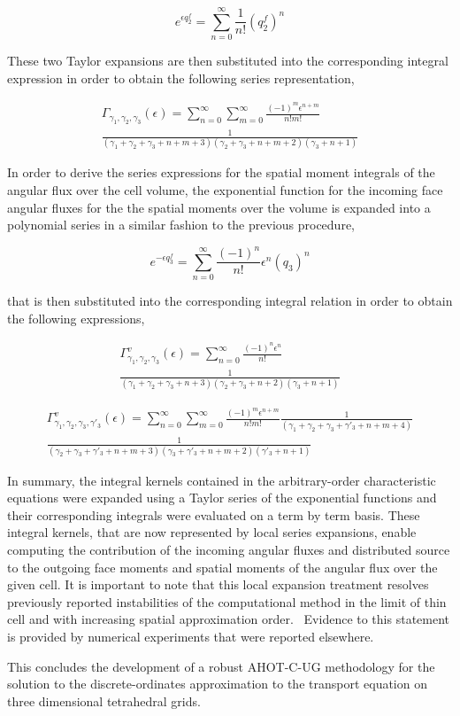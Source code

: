 \begin{equation} 
    e^{\epsilon q_2^f} = \sum_{n=0}^{\infty} \frac{1}{n!} \left( q_2^f \right) ^n
\end{equation}	
 
\noindent These two Taylor expansions are then substituted into the corresponding integral expression in order to obtain the following series representation,

\begin{multline} 
    \Gamma_{\gamma_1 ,\gamma_2 ,\gamma_3} ( \epsilon ) = \sum_{n=0}^{\infty} \sum_{m=0}^{\infty} \frac{(-1)^m \epsilon^{n+m}}{n! m!} \\
    \frac{1}{( \gamma_1 + \gamma_2 + \gamma_3 +n+m+3) ( \gamma_2 + \gamma_3 +n+m+2) (\gamma_3 +n+1)}
\end{multline}	 

In order to derive the series expressions for the spatial moment integrals of the angular flux over the cell volume, the exponential function for the incoming face angular fluxes for the the spatial moments over the volume is expanded into a polynomial series in a similar fashion to the previous procedure,

\begin{equation}
    e^{- \epsilon q^f_3} = \sum_{n=0}^{\infty} \frac{(-1)^n}{n!} \epsilon^n \left( q_3 \right) ^n
\end{equation}

\noindent that is then substituted into the corresponding integral relation in order to obtain the following expressions,

\begin{multline} 
    \Gamma^v_{\gamma_1 ,\gamma_2 ,\gamma_3} ( \epsilon ) = \sum_{n=0}^{\infty} \frac{(-1)^n \epsilon^{n}}{n!} \\
    \frac{1}{( \gamma_1 + \gamma_2 + \gamma_3 +n+3) ( \gamma_2 + \gamma_3 +n+2) (\gamma_3 +n+1)}
\end{multline}

\begin{multline} 
    \Gamma^v_{\gamma_1 ,\gamma_2 ,\gamma_3 ,\gamma'_3} ( \epsilon ) = \sum_{n=0}^{\infty} \sum_{m=0}^{\infty} \frac{(-1)^m \epsilon^{n+m}}{n! m!} \frac{1}{( \gamma_1 + \gamma_2 + \gamma_3 + \gamma'_3 +n+m+4)}\\
    \frac{1}{( \gamma_2 + \gamma_3 + \gamma'_3 +n+m+3) ( \gamma_3 + \gamma'_3 +n+m+2) ( \gamma'_3 +n+1)}
\end{multline}

In summary, the integral kernels contained in the arbitrary-order characteristic equations were expanded using a Taylor series of the exponential functions and their corresponding integrals were evaluated on a term by term basis. These integral kernels, that are now represented by local series expansions, enable computing the contribution of the incoming angular fluxes and distributed source to the outgoing face moments and spatial moments of the angular flux over the given cell. It is important to note that this local expansion treatment resolves previously reported instabilities of the computational method in the limit of thin cell and with increasing spatial approximation order.~\cite{Azmy2001} Evidence to this statement is provided by numerical experiments that were reported elsewhere.

This concludes the development of a robust AHOT-C-UG methodology for the solution to the discrete-ordinates approximation to the transport equation
on three dimensional tetrahedral grids.